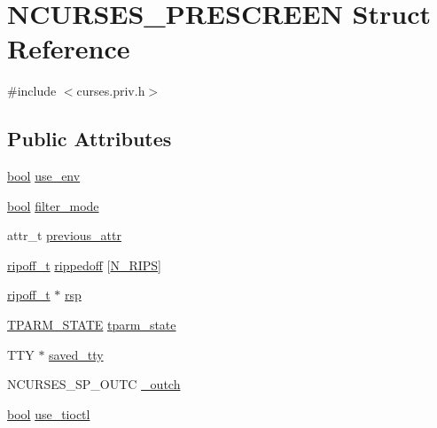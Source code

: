 \hypertarget{struct_n_c_u_r_s_e_s___p_r_e_s_c_r_e_e_n}{\section{N\-C\-U\-R\-S\-E\-S\-\_\-\-P\-R\-E\-S\-C\-R\-E\-E\-N Struct Reference}
\label{struct_n_c_u_r_s_e_s___p_r_e_s_c_r_e_e_n}
}


{\ttfamily \#include $<$curses.\-priv.\-h$>$}

\subsection*{Public Attributes}
\begin{DoxyCompactItemize}
\item 
\hyperlink{term__entry_8h_a002004ba5d663f149f6c38064926abac}{bool} \hyperlink{struct_n_c_u_r_s_e_s___p_r_e_s_c_r_e_e_n_a354f4848a407a67959672c3dba2465d9}{use\-\_\-env}
\item 
\hyperlink{term__entry_8h_a002004ba5d663f149f6c38064926abac}{bool} \hyperlink{struct_n_c_u_r_s_e_s___p_r_e_s_c_r_e_e_n_a8c57c5b2de80f1fd3ea389b18fddb055}{filter\-\_\-mode}
\item 
attr\-\_\-t \hyperlink{struct_n_c_u_r_s_e_s___p_r_e_s_c_r_e_e_n_abf5a2957b5e5df48b9a877a77ce21505}{previous\-\_\-attr}
\item 
\hyperlink{structripoff__t}{ripoff\-\_\-t} \hyperlink{struct_n_c_u_r_s_e_s___p_r_e_s_c_r_e_e_n_af01dcc3a48a39e2703484d7e7718ff1a}{rippedoff} \mbox{[}\hyperlink{curses_8priv_8h_a9cdf3fc310077b993174f62b63aea43d}{N\-\_\-\-R\-I\-P\-S}\mbox{]}
\item 
\hyperlink{structripoff__t}{ripoff\-\_\-t} $\ast$ \hyperlink{struct_n_c_u_r_s_e_s___p_r_e_s_c_r_e_e_n_af09a549c5d159c100f59f9300efe6c87}{rsp}
\item 
\hyperlink{struct_t_p_a_r_m___s_t_a_t_e}{T\-P\-A\-R\-M\-\_\-\-S\-T\-A\-T\-E} \hyperlink{struct_n_c_u_r_s_e_s___p_r_e_s_c_r_e_e_n_ade536d5c58b122db41b3984042897e83}{tparm\-\_\-state}
\item 
T\-T\-Y $\ast$ \hyperlink{struct_n_c_u_r_s_e_s___p_r_e_s_c_r_e_e_n_ac30ed8e83e1fe62d08dda4bc964d5314}{saved\-\_\-tty}
\item 
N\-C\-U\-R\-S\-E\-S\-\_\-\-S\-P\-\_\-\-O\-U\-T\-C \hyperlink{struct_n_c_u_r_s_e_s___p_r_e_s_c_r_e_e_n_a9c0e41058ec793884951d54c65593bf4}{\-\_\-outch}
\item 
\hyperlink{term__entry_8h_a002004ba5d663f149f6c38064926abac}{bool} \hyperlink{struct_n_c_u_r_s_e_s___p_r_e_s_c_r_e_e_n_a4021cf4916ddc7e508c61fe246ce27a8}{use\-\_\-tioctl}
\end{DoxyCompactItemize}


